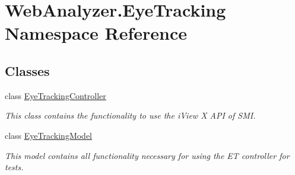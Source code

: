 \hypertarget{namespace_web_analyzer_1_1_eye_tracking}{}\section{Web\+Analyzer.\+Eye\+Tracking Namespace Reference}
\label{namespace_web_analyzer_1_1_eye_tracking}
\subsection*{Classes}
\begin{DoxyCompactItemize}
\item 
class \hyperlink{class_web_analyzer_1_1_eye_tracking_1_1_eye_tracking_controller}{Eye\+Tracking\+Controller}
\begin{DoxyCompactList}\small\item\em This class contains the functionality to use the i\+View X A\+P\+I of S\+M\+I. \end{DoxyCompactList}\item 
class \hyperlink{class_web_analyzer_1_1_eye_tracking_1_1_eye_tracking_model}{Eye\+Tracking\+Model}
\begin{DoxyCompactList}\small\item\em This model contains all functionality necessary for using the E\+T controller for tests. \end{DoxyCompactList}\end{DoxyCompactItemize}
